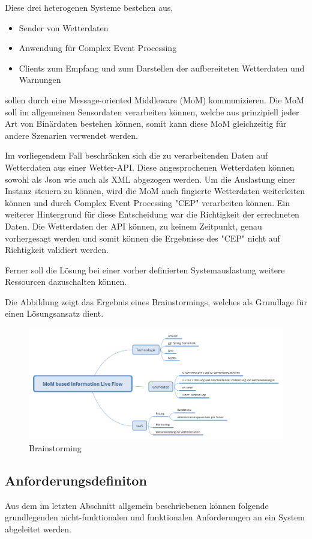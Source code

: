 \documentclass[paper,oneside,onecolumn,notitlepage,bibtotocnumbered,fontsize=12pt,bigheadings,ngerman]{scrartcl}
\begin{document}
Diese drei heterogenen Systeme bestehen aus,
\begin{itemize}
\item Sender von Wetterdaten
\item Anwendung für Complex Event Processing
\item Clients zum Empfang und zum Darstellen der aufbereiteten Wetterdaten und Warnungen
\end{itemize}
sollen durch eine Message-oriented Middleware (MoM) kommunizieren. Die MoM soll im allgemeinen Sensordaten verarbeiten können, welche 
aus prinzipiell jeder Art von Binärdaten bestehen können, somit kann diese MoM gleichzeitig für andere Szenarien verwendet werden. 

Im vorliegendem Fall beschränken sich die zu verarbeitenden Daten auf Wetterdaten aus einer Wetter-API. Diese angesprochenen Wetterdaten können sowohl als Json wie auch als XML abgezogen werden. Um die Auslastung einer Instanz steuern zu können, wird die MoM auch fingierte Wetterdaten weiterleiten können und durch Complex Event Processing "CEP" verarbeiten können. Ein weiterer Hintergrund für diese Entscheidung war die Richtigkeit der errechneten Daten. Die Wetterdaten der API können, zu keinem Zeitpunkt, genau vorhergesagt werden und somit können die Ergebnisse des "CEP" nicht auf Richtigkeit validiert werden. 

Ferner soll die Lösung bei einer vorher definierten Systemauslastung weitere Ressourcen dazuschalten können. 

Die Abbildung zeigt das Ergebnis eines Brainstormings, welches als Grundlage für einen Lösungsansatz dient.

\begin{figure}[!ht]
\centering
\includegraphics[width=450pt]{MoM based Information Live Flow.png}
\caption{Brainstorming}
\end{figure}


\subsection{Anforderungsdefiniton}
Aus dem im letzten Abschnitt allgemein beschriebenen können folgende grundlegenden nicht-funktionalen und funktionalen Anforderungen an ein System abgeleitet werden. 
\end{document}
